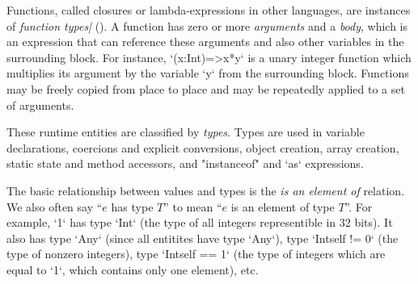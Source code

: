 Functions, called closures or lambda-expressions in other languages, are
instances of {\em function types|} (). 
A function has zero or more {\em arguments} and a {\em body}, which is
an expression that can reference these arguments and also other
variables in the surrounding block. For instance, \xcd`(x:Int)=>x*y`
is a unary integer function which multiplies its argument by the
variable \xcd`y` from the surrounding block.  Functions may be freely
copied from place to place and may be repeatedly applied to a set of
arguments.

These runtime entities are classified by {\em types}. Types are used in
variable declarations, coercions and  explicit conversions, object creation,
array creation, static state and method accessors, and
\xcd"instanceof" and \xcd`as` expressions.


The basic relationship between values and types is the {\em is an
  element of} relation.  We also often say ``$e$ has type $T$'' to
mean ``$e$ is an element of type $T$''.  For example, \xcd`1` has type
\xcd`Int` (the type of all integers representible in 32 bits). It also
has type \xcd`Any` (since all entitites have type \xcd`Any`), type
\xcd`Int{self != 0}` (the type of nonzero integers), type
\xcd`Int{self == 1}` (the type of integers which are equal to \xcd`1`, which
contains only one element), etc. 


